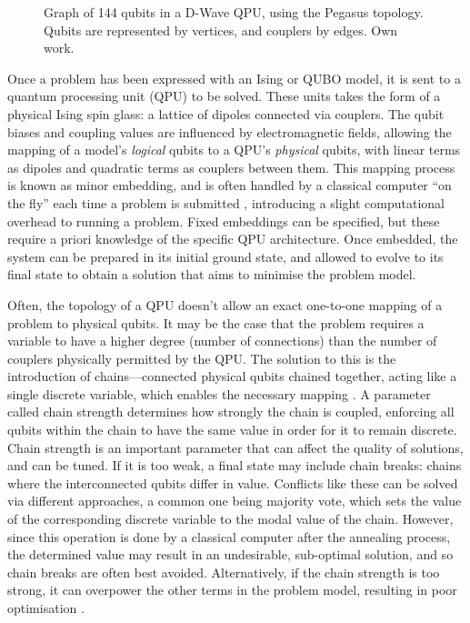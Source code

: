 \documentclass[12pt]{article}
\theoremstyle{definition}
\begin{document}
\begin{figure}[ht]
    \centering
    
    \caption{Graph of \num{144} qubits in a D-Wave QPU, using the Pegasus topology. Qubits are represented by vertices, and couplers by edges. Own work.}
    \label{fig:pegasus}
\end{figure}

Once a problem has been expressed with an Ising or QUBO model, it is sent to a quantum processing unit (QPU) to be solved. These units takes the form of a physical Ising spin glass: a lattice of dipoles connected via couplers. The qubit biases and coupling values are influenced by electromagnetic fields, allowing the mapping of a model's \emph{logical} qubits to a QPU's \emph{physical} qubits, with linear terms as dipoles and quadratic terms as couplers between them. This mapping process is known as minor embedding, and is often handled by a classical computer ``on the fly'' each time a problem is submitted \cite{dwave_embedding}, introducing a slight computational overhead to running a problem. Fixed embeddings can be specified, but these require a priori knowledge of the specific QPU architecture. Once embedded, the system can be prepared in its initial ground state, and allowed to evolve to its final state to obtain a solution that aims to minimise the problem model.

Often, the topology of a QPU doesn't allow an exact one-to-one mapping of a problem to physical qubits. It may be the case that the problem requires a variable to have a higher degree (number of connections) than the number of couplers physically permitted by the QPU. The solution to this is the introduction of chains---connected physical qubits chained together, acting like a single discrete variable, which enables the necessary mapping \cite{dwave_embedding}. A parameter called chain strength determines how strongly the chain is coupled, enforcing all qubits within the chain to have the same value in order for it to remain discrete. Chain strength is an important parameter that can affect the quality of solutions, and can be tuned. If it is too weak, a final state may include chain breaks: chains where the interconnected qubits differ in value. Conflicts like these can be solved via different approaches, a common one being majority vote, which sets the value of the corresponding discrete variable to the modal value of the chain. However, since this operation is done by a classical computer after the annealing process, the determined value may result in an undesirable, sub-optimal solution, and so chain breaks are often best avoided. Alternatively, if the chain strength is too strong, it can overpower the other terms in the problem model, resulting in poor optimisation \cite{dwave_embedguidance}.
\end{document}
